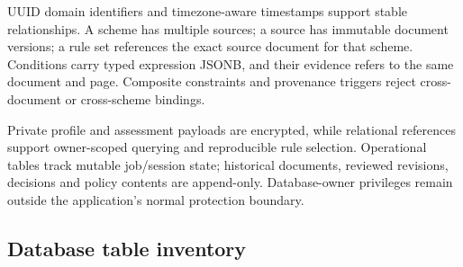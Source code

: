 \documentclass[12pt,a4paper,twoside]{report}
\begin{document}
UUID domain identifiers and timezone-aware timestamps support stable relationships. A scheme has multiple sources; a source has immutable document versions; a rule set references the exact source document for that scheme. Conditions carry typed expression JSONB, and their evidence refers to the same document and page. Composite constraints and provenance triggers reject cross-document or cross-scheme bindings.

Private profile and assessment payloads are encrypted, while relational references support owner-scoped querying and reproducible rule selection. Operational tables track mutable job/session state; historical documents, reviewed revisions, decisions and policy contents are append-only. Database-owner privileges remain outside the application's normal protection boundary.

\subsection*{Database table inventory}
\end{document}
